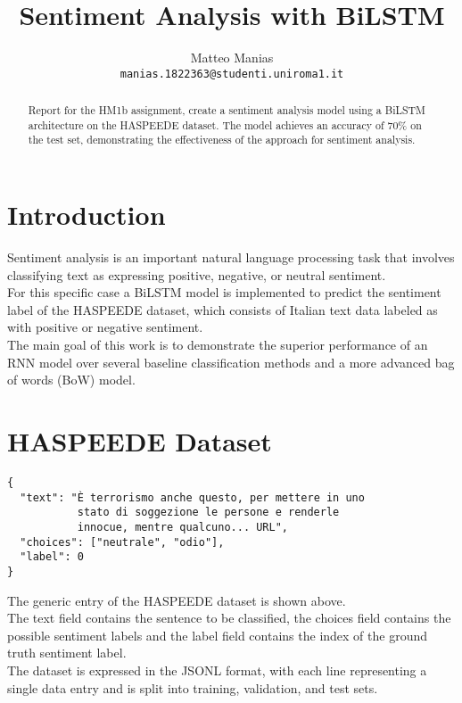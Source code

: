 \documentclass[11pt,a4paper]{article}
\title{Sentiment Analysis with BiLSTM}
\author{Matteo Manias \\ 
    \texttt{manias.1822363@studenti.uniroma1.it}}
\date{}
\begin{document}
\maketitle

\begin{abstract}
Report for the HM1b assignment, create a sentiment analysis model using a BiLSTM architecture on the HASPEEDE dataset. The model achieves an accuracy of 70\% on the test set, demonstrating the effectiveness of the approach for sentiment analysis.
\end{abstract}

\section{Introduction}
Sentiment analysis is an important natural language processing task that involves classifying text as expressing positive,
negative, or neutral sentiment.
\\ For this specific case a BiLSTM model is implemented to predict the sentiment label of the HASPEEDE dataset,
 which consists of Italian text data labeled as with positive or negative sentiment.
\\ The main goal of this work is to demonstrate the superior performance of an RNN model over
several baseline classification methods and a more advanced bag of words (BoW) model.

\section{HASPEEDE Dataset}
\begin{adjustbox}{width=0.5\columnwidth}
\begin{minipage}{\linewidth}
\begin{verbatim}
{
  "text": "È terrorismo anche questo, per mettere in uno 
           stato di soggezione le persone e renderle 
           innocue, mentre qualcuno... URL",
  "choices": ["neutrale", "odio"],
  "label": 0
}
\end{verbatim}
\end{minipage}
\end{adjustbox}

The generic entry of the HASPEEDE dataset is shown above.
\\The text field contains the sentence to be classified, the choices field contains the possible sentiment labels
and the label field contains the index of the ground truth sentiment label.
\\The dataset is expressed in the JSONL format, with each line representing a single data entry and is split into training, validation, and test sets.
\end{document}
